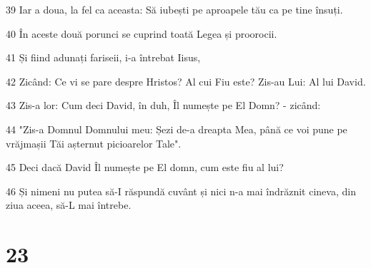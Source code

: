 \par 39 Iar a doua, la fel ca aceasta: Să iubești pe aproapele tău ca pe tine însuți.
\par 40 În aceste două porunci se cuprind toată Legea și proorocii.
\par 41 Și fiind adunați fariseii, i-a întrebat Iisus,
\par 42 Zicând: Ce vi se pare despre Hristos? Al cui Fiu este? Zis-au Lui: Al lui David.
\par 43 Zis-a lor: Cum deci David, în duh, Îl numește pe El Domn? - zicând:
\par 44 "Zis-a Domnul Domnului meu: Șezi de-a dreapta Mea, până ce voi pune pe vrăjmașii Tăi așternut picioarelor Tale".
\par 45 Deci dacă David Îl numește pe El domn, cum este fiu al lui?
\par 46 Și nimeni nu putea să-I răspundă cuvânt și nici n-a mai îndrăznit cineva, din ziua aceea, să-L mai întrebe.

\chapter{23}

